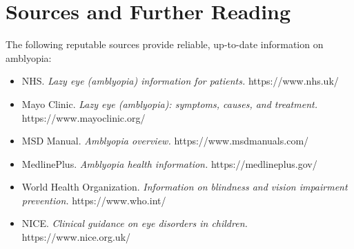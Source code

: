 \section*{Sources and Further Reading}
The following reputable sources provide reliable, up-to-date information on amblyopia:

\begin{itemize}
    \item NHS. \textit{Lazy eye (amblyopia) information for patients.} https://www.nhs.uk/
    \item Mayo Clinic. \textit{Lazy eye (amblyopia): symptoms, causes, and treatment.} https://www.mayoclinic.org/
    \item MSD Manual. \textit{Amblyopia overview.} https://www.msdmanuals.com/
    \item MedlinePlus. \textit{Amblyopia health information.} https://medlineplus.gov/
    \item World Health Organization. \textit{Information on blindness and vision impairment prevention.} https://www.who.int/
    \item NICE. \textit{Clinical guidance on eye disorders in children.} https://www.nice.org.uk/
\end{itemize}
